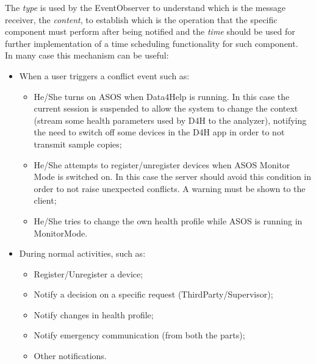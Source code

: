 \begin{flushleft}
The \textit{type} is used by the EventObserver to understand which is the message receiver, the \textit{content}, to establish which is the operation that the specific component must perform after being notified and the \textit{time} should be used for further implementation of a time scheduling functionality for such component.\\
In many case this mechanism can be useful:
\begin{itemize}
	\item When a user triggers a conflict event such as:
	\begin{itemize}
		\item He/She turns on ASOS when Data4Help is running. In this case the current session is suspended to allow the system to change the context (stream some health parameters used by D4H to the analyzer), notifying the need to switch off some devices in the D4H app in order to not transmit sample copies;
		\item He/She attempts to register/unregister devices when ASOS Monitor Mode is switched on. In this case the server should avoid this condition in order to not raise unexpected conflicts. A warning must be shown to the client;
		\item He/She tries to change the own health profile while ASOS is running in MonitorMode.
	\end{itemize}
	\item During normal activities, such as:
	\begin{itemize}
		\item Register/Unregister a device;
		\item Notify a decision on a specific request (ThirdParty/Supervisor);
		\item Notify changes in health profile;
		\item Notify emergency communication (from both the parts);
		\item Other notifications.
	\end{itemize} 
\end{itemize}


\end{flushleft}
